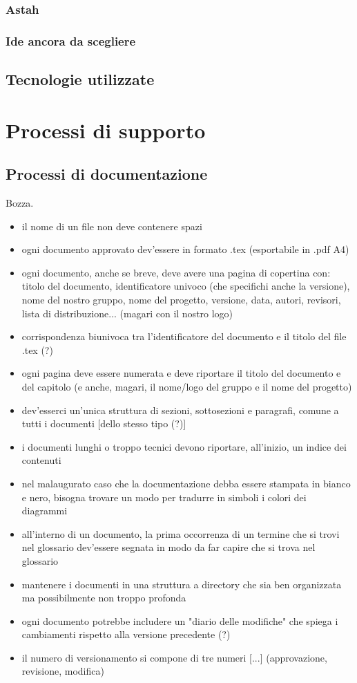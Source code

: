 		\subsubsection{Astah}
		\subsubsection{Ide ancora da scegliere}
	\subsection{Tecnologie utilizzate}
\section{Processi di supporto}

\subsection{Processi di documentazione}
Bozza.
\begin{itemize}
	\item il nome di un file non deve contenere spazi 
	\item ogni documento approvato dev'essere in formato .tex (esportabile in .pdf A4)
	\item ogni documento, anche se breve, deve avere una pagina di copertina con: titolo del documento, identificatore univoco (che specifichi anche la versione), nome del nostro gruppo, nome del progetto, versione, data, autori, revisori, lista di distribuzione... (magari con il nostro logo)
	\item corrispondenza biunivoca tra l'identificatore del documento e il titolo del file .tex (?)
	\item ogni pagina deve essere numerata e deve riportare il titolo del documento e del capitolo (e anche, magari, il nome/logo del gruppo e il nome del progetto)
	\item dev'esserci un'unica struttura di sezioni, sottosezioni e paragrafi, comune a tutti i documenti [dello stesso tipo (?)]
	\item i documenti lunghi o troppo tecnici devono riportare, all'inizio, un indice dei contenuti
	\item nel malaugurato caso che la documentazione debba essere stampata in bianco e nero, bisogna trovare un modo per tradurre in simboli i colori dei diagrammi
	\item all'interno di un documento, la prima occorrenza di un termine che si trovi nel glossario dev'essere segnata in modo da far capire che si trova nel glossario
	\item mantenere i documenti in una struttura a directory che sia ben organizzata ma possibilmente non troppo profonda
	\item ogni documento potrebbe includere un "diario delle modifiche" che spiega i cambiamenti rispetto alla versione precedente (?)
	\item il numero di versionamento si compone di tre numeri [...] (approvazione, revisione, modifica)
\end{itemize}

